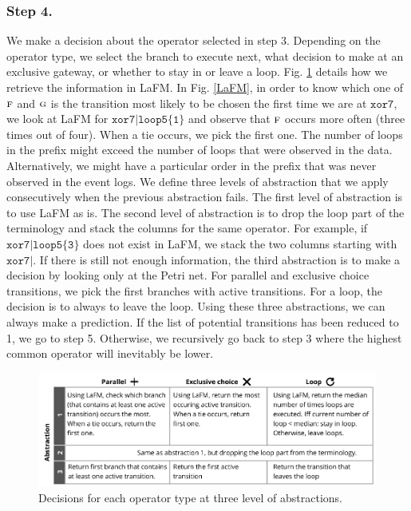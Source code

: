 \documentclass[runningheads]{llncs}
\begin{document}
\subsubsection{Step 4.} We make a decision about the operator selected in step 3. Depending on the operator type, we select the branch to execute next, what decision to make at an exclusive gateway, or whether to stay in or leave a loop. Fig. \ref{fig:decision} details how we retrieve the information in LaFM. In Fig. \ref{LaFM}, in order to know which one of $\textsc{f}$ and $\textsc{g}$ is the transition most likely to be chosen the first time we are at $\texttt{xor7}$, we look at LaFM for $\texttt{xor7|loop5\{1\}}$ and observe that $\textsc{f}$ occurs more often (three times out of four). When a tie occurs, we pick the first one. The number of loops in the prefix might exceed the number of loops that were observed in the data. Alternatively, we might have a particular order in the prefix that was never observed in the event logs. We define three levels of abstraction that we apply consecutively when the previous abstraction fails. The first level of abstraction is to use LaFM as is. The second level of abstraction is to drop the loop part of the terminology and stack the columns for the same operator. For example, if $\texttt{xor7|loop5\{3\}}$ does not exist in LaFM, we stack the two columns starting with $\texttt{xor7|}$. If there is still not enough information, the third abstraction is to make a decision by looking only at the Petri net. For parallel and exclusive choice transitions, we pick the first branches with active transitions. For a loop, the decision is to always to leave the loop. Using these three abstractions, we can always make a prediction. If the list of potential transitions has been reduced to 1, we go to step 5. Otherwise, we recursively go back to step 3 where the highest common operator will inevitably be lower.
 
\begin{figure}
\begin{center}
\includegraphics[width=1\columnwidth]{02-schema/decision.pdf}
\caption{Decisions for each operator type at three level of abstractions.}
\label{fig:decision}
\end{center}
\vspace{-10pt}
\end{figure} 
\end{document}

